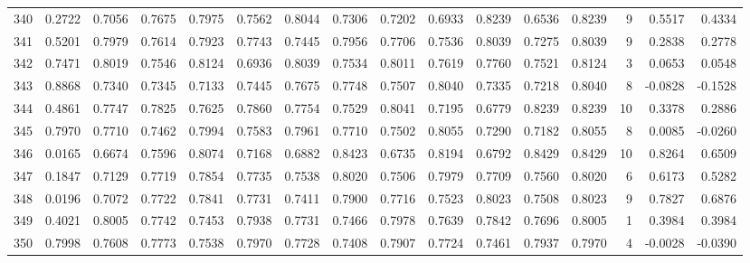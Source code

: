 \begin{tabular}{lrrrrrrrrrrrrrrr}
340 &      0.2722 &  0.7056 &  0.7675 &  0.7975 &  0.7562 &  0.8044 &  0.7306 &  0.7202 &  0.6933 &  0.8239 &   0.6536 &     0.8239 &      9 &                    0.5517 &                     0.4334 \\
341 &      0.5201 &  0.7979 &  0.7614 &  0.7923 &  0.7743 &  0.7445 &  0.7956 &  0.7706 &  0.7536 &  0.8039 &   0.7275 &     0.8039 &      9 &                    0.2838 &                     0.2778 \\
342 &      0.7471 &  0.8019 &  0.7546 &  0.8124 &  0.6936 &  0.8039 &  0.7534 &  0.8011 &  0.7619 &  0.7760 &   0.7521 &     0.8124 &      3 &                    0.0653 &                     0.0548 \\
343 &      0.8868 &  0.7340 &  0.7345 &  0.7133 &  0.7445 &  0.7675 &  0.7748 &  0.7507 &  0.8040 &  0.7335 &   0.7218 &     0.8040 &      8 &                   -0.0828 &                    -0.1528 \\
344 &      0.4861 &  0.7747 &  0.7825 &  0.7625 &  0.7860 &  0.7754 &  0.7529 &  0.8041 &  0.7195 &  0.6779 &   0.8239 &     0.8239 &     10 &                    0.3378 &                     0.2886 \\
345 &      0.7970 &  0.7710 &  0.7462 &  0.7994 &  0.7583 &  0.7961 &  0.7710 &  0.7502 &  0.8055 &  0.7290 &   0.7182 &     0.8055 &      8 &                    0.0085 &                    -0.0260 \\
346 &      0.0165 &  0.6674 &  0.7596 &  0.8074 &  0.7168 &  0.6882 &  0.8423 &  0.6735 &  0.8194 &  0.6792 &   0.8429 &     0.8429 &     10 &                    0.8264 &                     0.6509 \\
347 &      0.1847 &  0.7129 &  0.7719 &  0.7854 &  0.7735 &  0.7538 &  0.8020 &  0.7506 &  0.7979 &  0.7709 &   0.7560 &     0.8020 &      6 &                    0.6173 &                     0.5282 \\
348 &      0.0196 &  0.7072 &  0.7722 &  0.7841 &  0.7731 &  0.7411 &  0.7900 &  0.7716 &  0.7523 &  0.8023 &   0.7508 &     0.8023 &      9 &                    0.7827 &                     0.6876 \\
349 &      0.4021 &  0.8005 &  0.7742 &  0.7453 &  0.7938 &  0.7731 &  0.7466 &  0.7978 &  0.7639 &  0.7842 &   0.7696 &     0.8005 &      1 &                    0.3984 &                     0.3984 \\
350 &      0.7998 &  0.7608 &  0.7773 &  0.7538 &  0.7970 &  0.7728 &  0.7408 &  0.7907 &  0.7724 &  0.7461 &   0.7937 &     0.7970 &      4 &                   -0.0028 &                    -0.0390 \\

\end{tabular}
